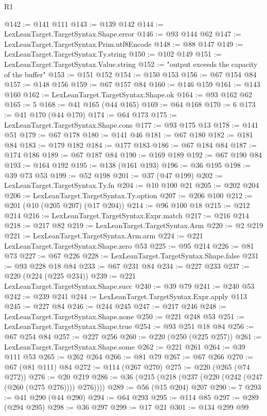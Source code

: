 \begin{lexlean}{R1}
\begin{coremodule}
{{{{{{{{{{{{{{{{{{{{{{{{{{{{{{{{{{{{{{{{@142 := @141 @111
@143 := @139 @142
@144 := LexLeanTarget.TargetSyntax.Shape.error
@146 := @93 @144 @62
@147 := LexLeanTarget.TargetSyntax.Prim.utf8Encode
@148 := @88 @147
@149 := LexLeanTarget.TargetSyntax.Ty.string
@150 := @102 @149
@151 := LexLeanTarget.TargetSyntax.Value.string
@152 := "output exceeds the capacity of the buffer"
@153 := @151 @152
@154 := @150 @153
@156 := @67 @154 @84
@157 := @148 @156
@159 := @67 @157 @84
@160 := @146 @159
@161 := @143 @160
@162 := LexLeanTarget.TargetSyntax.Shape.ok
@164 := @93 @162 @62
@165 := 5
@168 := @41 @165 (@44 @165)
@169 := @64 @168
@170 := 6
@173 := @41 @170 (@44 @170)
@174 := @64 @173
@175 := LexLeanTarget.TargetSyntax.Shape.cons
@177 := @93 @175 @13
@178 := @141 @51
@179 := @67 @178
@180 := @141 @46
@181 := @67 @180
@182 := @181 @84
@183 := @179 @182
@184 := @177 @183
@186 := @67 @184 @84
@187 := @174 @186
@189 := @67 @187 @84
@190 := @169 @189
@192 := @67 @190 @84
@193 := @164 @192
@195 := @138 (@161 @193)
@196 := @36 @195
@198 := @39 @73 @53
@199 := @52 @198
@201 := @37 (@47 @199)
@202 := LexLeanTarget.TargetSyntax.Ty.fn
@204 := @10 @100 @21
@205 := @202 @204
@206 := LexLeanTarget.TargetSyntax.Ty.option
@207 := @206 @100
@212 := @201 (@10 (@205 @207) (@17 @204))
@214 := @96 @100 @18
@215 := @212 @214
@216 := LexLeanTarget.TargetSyntax.Expr.match
@217 := @216 @214
@218 := @217 @82
@219 := LexLeanTarget.TargetSyntax.Arm
@220 := @2 @219
@221 := LexLeanTarget.TargetSyntax.Arm.arm
@224 := @221 LexLeanTarget.TargetSyntax.Shape.zero @53
@225 := @95 @214
@226 := @81 @73
@227 := @67 @226
@228 := LexLeanTarget.TargetSyntax.Shape.false
@231 := @93 @228 @18 @84
@233 := @67 @231 @84
@234 := @227 @233
@237 := @220 (@224 (@225 @234))
@239 := @221 LexLeanTarget.TargetSyntax.Shape.succ
@240 := @39 @79
@241 := @240 @53
@242 := @239 @241
@244 := LexLeanTarget.TargetSyntax.Expr.apply @113
@245 := @227 @84
@246 := @244 @245
@247 := @217 @246
@248 := LexLeanTarget.TargetSyntax.Shape.none
@250 := @221 @248 @53
@251 := LexLeanTarget.TargetSyntax.Shape.true
@254 := @93 @251 @18 @84
@256 := @67 @254 @84
@257 := @227 @256
@260 := @220 (@250 (@225 @257))
@261 := LexLeanTarget.TargetSyntax.Shape.some
@262 := @221 @261
@264 := @39 @111 @53
@265 := @262 @264
@266 := @81 @79
@267 := @67 @266
@270 := @67 (@81 @111) @84
@272 := @114 (@267 @270)
@275 := @220 (@265 (@74 @272))
@276 := @20 @219
@286 := @36 (@215 (@218 (@237 (@220 (@242 (@247 (@260 (@275 @276)))) @276))))
@289 := @56 (@15 @204) @207
@290 := 7
@293 := @41 @290 (@44 @290)
@294 := @64 @293
@295 := @114 @85
@297 := @289 (@294 @295)
@298 := @36 @297
@299 := @17 @21
@301 := @134 @299 @99
}}}}}}}}}}}}}}}}}}}}}}}}}}}}}}}}}}}}}}}}
\end{coremodule}
\end{lexlean}
